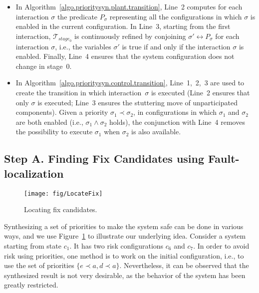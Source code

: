 \documentclass[10pt, a4paper, onecolumn, conference, compsocconf]{IEEEtran}
\begin{document}
\begin{itemize}
\item In Algorithm~\ref{algo.prioritysyn.plant.transition},  Line~2
  computes for each interaction $\sigma$ the predicate $P_{\sigma}$ representing all the
  configurations in which $\sigma$ is enabled in the current configuration.
In Line~3, starting from the first interaction,
  $\mathcal{T}_{stage_0}$ is continuously refined by conjoining
  $\sigma' \leftrightarrow P_{\sigma}$ for each interaction
  $\sigma$, i.e., the variables $\sigma'$ is true if and only if the
  interaction $\sigma$ is enabled.
Finally, Line~4 ensures that
the system configuration does not change in stage~$0$.
\item In Algorithm~\ref{algo.prioritysyn.control.transition},
  Line~1,~2,~3 are used to create the transition in which
  interaction~$\sigma$ is executed (Line~2 ensures that only $\sigma$
  is executed; Line~3 ensures the stuttering move of unparticipated
  components). Given a priority $\sigma_1 \prec \sigma_2$, in
  configurations in which $\sigma_1$ and $\sigma_2$ are both enabled
  (i.e., $\sigma_1 \wedge \sigma_2$ holds), the conjunction with Line~4
  removes the possibility to execute $\sigma_1$ when $\sigma_2$ is
  also available.
\end{itemize}


\clearpage
\subsection{Step A. Finding Fix Candidates using Fault-localization\label{subsec.algo.prioritysyn.findingfix}} 
\begin{figure}[t]
\centering
 \texttt{[image: fig/LocateFix]}
  \caption{Locating fix candidates.}
 \label{fig:vissbip.locate.fix}
\end{figure}

Synthesizing a set of priorities to make the system safe can be done
in various ways, and we use Figure~\ref{fig:vissbip.locate.fix} to
illustrate our underlying idea. Consider a system starting from
state $c_1$. It has two risk configurations $c_6$ and $c_7$. In
order to avoid risk using priorities, one method is to work on the
initial configuration, i.e., to use the set of priorities $\{e \prec
a, d \prec a\}$.
Nevertheless, it can be
observed that the synthesized result is not very desirable, as the
behavior of the system has been greatly restricted.
\end{document}
